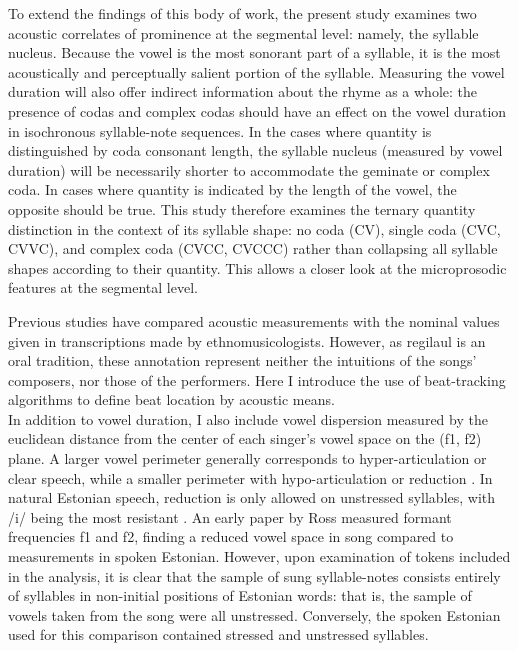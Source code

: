 To extend the findings of this body of work, the present study examines two acoustic correlates of prominence at the segmental level: namely, the syllable nucleus. Because the vowel is the most sonorant part of a syllable, it is the most acoustically and perceptually salient portion of the syllable. Measuring the vowel duration will also offer indirect information about the rhyme as a whole: the presence of codas and complex codas should have an effect on the vowel duration in isochronous syllable-note sequences. In the cases where quantity is distinguished by coda consonant length, the syllable nucleus (measured by vowel duration) will be necessarily shorter to accommodate the geminate or complex coda. In cases where quantity is indicated by the length of the vowel, the opposite should be true. This study therefore examines the ternary quantity distinction in the context of its syllable shape: no coda (CV), single coda (CVC, CVVC), and complex coda (CVCC, CVCCC) rather than collapsing all syllable shapes according to their quantity. This allows a closer look at the microprosodic features at the segmental level. 


  Previous studies have compared acoustic measurements with the nominal values given in transcriptions made by ethnomusicologists. However, as regilaul is an oral tradition, these annotation represent neither the intuitions of the songs' composers, nor those of the performers. Here I introduce the use of beat-tracking algorithms to define beat location by acoustic means. \\
  
  
In addition to vowel duration, I also include vowel dispersion measured by the euclidean distance from the center of each singer's vowel space on the (f1, f2) plane. A larger vowel perimeter generally corresponds to hyper-articulation or clear speech, while a smaller perimeter with hypo-articulation or reduction \cite{lindblom1990, smiljanic2005}. In natural Estonian speech, reduction is only allowed on unstressed syllables, with /i/ being the most resistant \citep{eekMeister1998}. An early paper by Ross measured formant frequencies f1 and f2, finding a reduced vowel space in song compared to measurements in spoken Estonian\cite{ross1992}. However, upon examination of tokens included in the analysis, it is clear that the sample of sung syllable-notes consists entirely of syllables in non-initial positions of Estonian words: that is, the sample of vowels taken from  the song were all unstressed. Conversely, the spoken Estonian used for this comparison contained stressed and unstressed syllables. 


